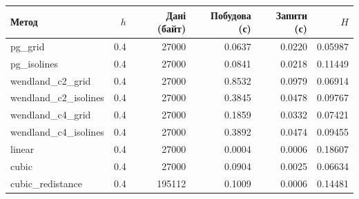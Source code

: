 \begin{tabular}{lrrrrr}\toprule
Метод & $h$ & Дані (байт) & Побудова (с) & Запити (с) & $H$ \\ \midrule
pg\_grid & 0.4 & 27000 & 0.0637 & 0.0220 & 0.05987 \\
pg\_isolines & 0.4 & 27000 & 0.0841 & 0.0218 & 0.11449 \\
wendland\_c2\_grid & 0.4 & 27000 & 0.8532 & 0.0979 & 0.06914 \\
wendland\_c2\_isolines & 0.4 & 27000 & 0.3845 & 0.0478 & 0.09767 \\
wendland\_c4\_grid & 0.4 & 27000 & 0.1859 & 0.0332 & 0.07421 \\
wendland\_c4\_isolines & 0.4 & 27000 & 0.3892 & 0.0474 & 0.09455 \\
linear & 0.4 & 27000 & 0.0004 & 0.0006 & 0.18607 \\
cubic & 0.4 & 27000 & 0.0904 & 0.0025 & 0.06634 \\
cubic\_redistance & 0.4 & 195112 & 0.1009 & 0.0006 & 0.14481 \\
\bottomrule\end{tabular}
